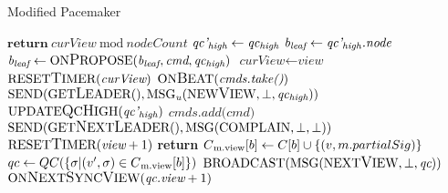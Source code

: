 \begin{algorithm}[h!]
	\caption{Modified Pacemaker}\label{pacemakeralgorithm}
	\begin{algorithmic}[1]
	 \label{code_getleader}
		\color{Green}
		\State $\textbf{return}\ \textit{curView}\ \text{mod}\ \textit{nodeCount}$
		\color{black}
	\EndFunction
			\State $ \textit{qc'\textsubscript{high}} \gets \textit{qc\textsubscript{high}} $
			\State $ \textit{b\textsubscript{leaf}} \gets \textit{qc'\textsubscript{high}.node}$
		\EndIf
	\EndProcedure
			\State $ \textit{b\textsubscript{leaf}} \gets \text{ON{\large P}ROPOSE}(\textit{b\textsubscript{leaf}}, \textit{cmd}, \textit{qc\textsubscript{high}})$
		\EndIf
	\EndProcedure
	 \label{code_onnextsyncview}
		\color{Green}
		\State $ \textit{curView} \gets \textit{view}$
		\State $ \text{RESET{\large T}IMER}(\textit{curView})$
		\State $ \text{ON{\large B}EAT}(\textit{cmds.take()})$ \label{code_takecmd}
		\color{black}
		\State $\text{SEND}(\text{GET{\large L}EADER}(), \text{MSG}\textsubscript{\textit{u}}(\text{NEW{\large V}IEW}, \bot, \textit{qc\textsubscript{high}}))$
	\EndProcedure
		\State $ \text{UPDATE{\large Q}C{\large H}IGH}(\textit{qc'\textsubscript{high}}) $
	\EndProcedure
	\color{Green}
	 \label{code_onreceiveclientreq}
		\State $ \textit{cmds.add(cmd)} $
	\EndProcedure
	 \label{code_ontimeout}
		\State $ \text{SEND}(\text{GET{\large N}EXT{\large L}EADER}(), \text{MSG}(\text{COMPLAIN}, \bot, \bot)) $ \label{code_timeout}
		\State $ \text{RESET{\large T}IMER}(\textit{view} + 1) $
	\EndProcedure
	 \label{code_onreceivecomplain}
				\State \textbf{return}
			\EndIf
			\State $C\textsubscript{m.view}[b] \gets C[b] \cup \{(v, m.partialSig)\}$
				\State $qc \gets QC(\{ \sigma | (v', \sigma) \in C\textsubscript{m.view}[b]\})$
				\State $\text{BROADCAST}(\text{MSG}(\text{NEXT{\large V}IEW}, \bot, \textit{qc}))$ \label{code_nextviewmsg}
			\EndIf
		\EndIf
	\EndProcedure
	 \label{code_onreceiveany}
				\State $\text{ON{\large N}EXT{\large S}YNC{\large V}IEW}(\textit{qc.view} + 1)$ \label{code_gotqc}
		\EndIf
	\EndProcedure
	\end{algorithmic}
\end{algorithm}

